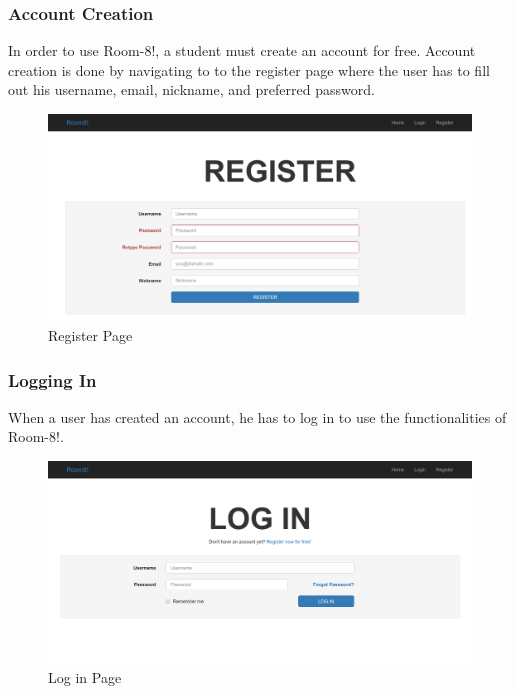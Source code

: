 \documentclass[journal]{./IEEE/IEEEtran}
\begin{document}
        \subsubsection{Account Creation}
        In order to use Room-8!, a student must create an account for free. Account creation is done by navigating to
        to the register page where the user has to fill out his username, email, nickname, and preferred password.
        \begin{figure}
                \includegraphics[width=\textwidth]{register.png}
                \caption{Register Page}
                \label{Registration Page}
        \end{figure}
        \subsubsection{Logging In}
        When a user has created an account, he has to log in to use the functionalities of Room-8!.
        \begin{figure}
                \includegraphics[width=\textwidth]{login.png}
                \caption{Log in Page}
                \label{Log in Page}
        \end{figure}
\end{document}
